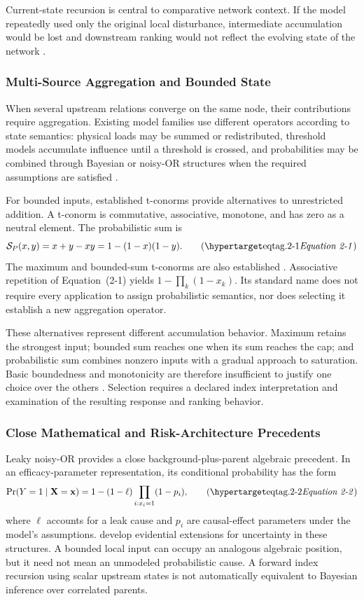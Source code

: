 Current-state recursion is central to comparative network context. If
the model repeatedly used only the original local disturbance,
intermediate accumulation would be lost and downstream ranking would not
reflect the evolving state of the network \citep{kempe2003,buldyrev2010,
petrone2018}.

\subsubsection{Multi-Source Aggregation and Bounded
State}\label{multi-source-aggregation-and-bounded-state}

When several upstream relations converge on the same node, their
contributions require aggregation. Existing model families use different
operators according to state semantics: physical loads may be summed or
redistributed, threshold models accumulate influence until a threshold
is crossed, and probabilities may be combined through Bayesian or
noisy-OR structures when the required assumptions are satisfied
\citep{kempe2003,munoz2017,buldyrev2010}.

For bounded inputs, established t-conorms provide alternatives to
unrestricted addition. A t-conorm is commutative, associative, monotone,
and has zero as a neutral element. The probabilistic sum is
\[
\mathcal{S}_{P}(x,y)=x+y-xy=1-(1-x)(1-y).
\eqtag{2-1}
\]
The maximum and bounded-sum t-conorms are also established
\citep{klement2004}. Associative repetition of Equation~(2-1) yields
$1-\prod_k(1-x_k)$. Its standard name does not require every application
to assign probabilistic semantics, nor does selecting it establish a
new aggregation operator.

These alternatives represent different accumulation behavior. Maximum
retains the strongest input; bounded sum reaches one when its sum reaches
the cap; and probabilistic sum combines nonzero inputs with a gradual
approach to saturation. Basic boundedness and monotonicity are therefore
insufficient to justify one choice over the others
\citep{klement2004}. Selection requires a declared index interpretation
and examination of the resulting response and ranking behavior.

\subsubsection{Close Mathematical and Risk-Architecture Precedents}
\label{close-prior-art}

Leaky noisy-OR provides a close background-plus-parent algebraic precedent.
In an efficacy-parameter representation, its conditional probability
has the form
\[
\Pr(Y=1\mid\mathbf{X}=\mathbf{x})
=1-(1-\ell)\prod_{i:x_i=1}(1-p_i),
\eqtag{2-2}
\]
where $\ell$ accounts for a leak cause and $p_i$ are causal-effect
parameters under the model's assumptions. \citet{fallet2012}
develop evidential extensions for uncertainty in these structures.
A bounded local input can occupy an analogous algebraic
position, but it need not mean an unmodeled probabilistic cause.
A forward index recursion using scalar upstream states is not
automatically equivalent to Bayesian inference over correlated parents.

